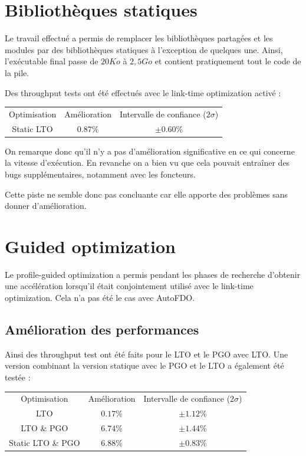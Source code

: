 \documentclass[a4paper,11pt]{report}
\begin{document}
\section{Bibliothèques statiques}
Le travail effectué a permis de remplacer les bibliothèques partagées et les modules par des bibliothèques statiques à l'exception de quelques une.
Ainsi, l'exécutable final passe de $20 Ko$ à $2,5 Go$ et contient pratiquement tout le code de la pile.

Des throughput tests ont été effectués avec le link-time optimization activé :
\begin{center}
    \begin{tabular}{ c c c }
        Optimisation & Amélioration & Intervalle de confiance ($2\sigma$) \\
        Static LTO   & $0.87\%$     & $\pm 0.60\%$
    \end{tabular}
\end{center}

On remarque donc qu'il n'y a pas d'amélioration significative en ce qui concerne la vitesse d'exécution.
En revanche on a bien vu que cela pouvait entraîner des bugs supplémentaires, notamment avec les foncteurs.

Cette piste ne semble donc pas concluante car elle apporte des problèmes sans donner d'amélioration.

\section{Guided optimization}
Le profile-guided optimization a permis pendant les phases de recherche d'obtenir une accélération lorsqu'il était conjointement utilisé avec le link-time optimization.
Cela n'a pas été le cas avec AutoFDO.

\subsection{Amélioration des performances}
Ainsi des throughput test ont été faits pour le LTO et le PGO avec LTO.
Une version combinant la version statique avec le PGO et le LTO a également été testée :
\begin{center}
    \begin{tabular}{ c c c }
        Optimisation      & Amélioration & Intervalle de confiance ($2\sigma$) \\
        LTO               & $0.17\%$     & $\pm 1.12\%$                        \\
        LTO \& PGO        & $6.74\%$     & $\pm 1.44\%$                        \\
        Static LTO \& PGO & $6.88\%$     & $\pm 0.83\%$
    \end{tabular}
\end{center}
\end{document}
